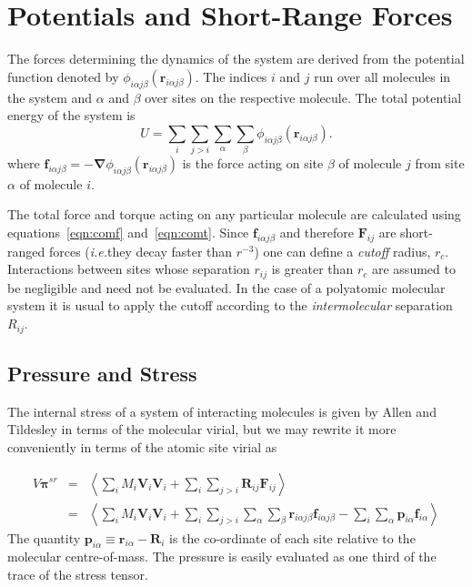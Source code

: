 \documentclass[a4paper,twoside]{report}
\newcommand{\bm}[1]{\mathbf{#1}}
\newcommand{\ie}{\emph{i.e.}}
\begin{document}
\section{Potentials and Short-Range Forces}%

The forces determining the dynamics of the system are derived from the
potential function denoted by $\phi_{i\alpha j\beta}(\bm{r} _{i\alpha
  j\beta})$.  The indices $i$ and $j$ run over all molecules in the
system and $\alpha$ and $\beta$ over sites on the respective molecule.
The total potential energy of the system is
\begin{equation}
\label{eqn:toten}
U = \sum_i \sum_{j > i} \sum_\alpha \sum_\beta \phi_{i\alpha j\beta}(
\bm{r}_{i\alpha j\beta}).
\end{equation}
where $\bm{f}_{i\alpha j\beta} = - \bm\nabla \phi_{i\alpha  j\beta}(
\bm{r}_{i\alpha j\beta})$ is the force acting on site $\beta$ of molecule
$j$ from site $\alpha$ of molecule $i$.

The total force and torque acting on any particular molecule are
calculated using equations~\ref{eqn:comf} and~\ref{eqn:comt}.  Since
$\bm{f}_{i\alpha j\beta}$ and therefore $\bm{F}_{ij}$ are short-ranged
forces (\ie they decay faster than $r^{-3}$) one can define a
\emph{cutoff} radius, $r_c$.  Interactions between sites whose
separation $r_{ij}$ is greater than $r_c$ are assumed to be negligible
and need not be evaluated.  In the case of a polyatomic molecular
system it is usual to apply the cutoff according to the
\emph{intermolecular} separation $R_{ij}$.


\subsection{Pressure and Stress}
The internal stress of a system of interacting molecules is given by
Allen and Tildesley\cite[pp 46-49]{allen:87} in terms of the molecular
virial, but we may rewrite it more conveniently in terms of the atomic
site virial as

\begin{eqnarray}
\label{eqn:stress-sr}
V \bm\pi^{sr} & = & \left <  \sum_i M_i \bm{V}_i \bm{V}_i 
              + \sum_i \sum_{j>i} \bm{R}_{ij} \bm{F}_{ij} 
\right > \\ \nonumber
& = & \left < \sum_i M_i \bm{V}_i \bm{V}_i 
              + \sum_{i} \sum_{j>i} \sum_\alpha \sum_\beta 
                \bm{r}_{i\alpha j\beta}  \bm{f}_{i\alpha j\beta} 
              - \sum_i \sum_\alpha \bm{p}_{i\alpha} \bm{f}_{i\alpha}
\right >
\end{eqnarray}
The quantity $\bm{p}_{i\alpha} \equiv \bm{r}_{i\alpha} - \bm{R}_i$ is the
co-ordinate of each site relative to the molecular centre-of-mass.
The pressure is easily evaluated as one third of the trace of the
stress tensor. 
\end{document}
